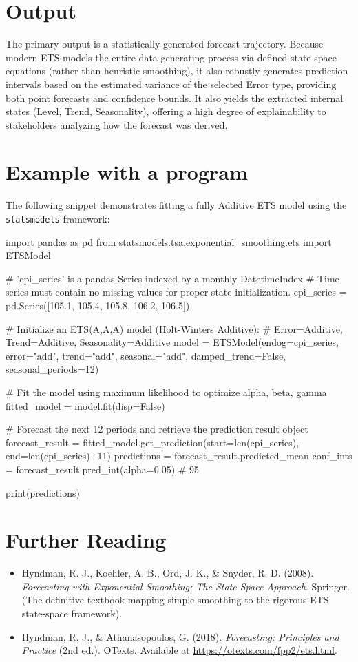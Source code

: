 \section{Output}
The primary output is a statistically generated forecast trajectory. Because modern ETS models the entire data-generating process via defined state-space equations (rather than heuristic smoothing), it also robustly generates prediction intervals based on the estimated variance of the selected Error type, providing both point forecasts and confidence bounds. It also yields the extracted internal states (Level, Trend, Seasonality), offering a high degree of explainability to stakeholders analyzing how the forecast was derived.

\section{Example with a program}
The following snippet demonstrates fitting a fully Additive ETS model using the \texttt{statsmodels} framework:

\begin{Python}[caption={ETS Implementation using Statsmodels}, label={lst:ets_python}]
import pandas as pd
from statsmodels.tsa.exponential_smoothing.ets import ETSModel

# 'cpi_series' is a pandas Series indexed by a monthly DatetimeIndex
# Time series must contain no missing values for proper state initialization.
cpi_series = pd.Series([105.1, 105.4, 105.8, 106.2, 106.5])

# Initialize an ETS(A,A,A) model (Holt-Winters Additive):
# Error=Additive, Trend=Additive, Seasonality=Additive
model = ETSModel(endog=cpi_series, 
                 error="add", 
                 trend="add", 
                 seasonal="add", 
                 damped_trend=False,
                 seasonal_periods=12)

# Fit the model using maximum likelihood to optimize alpha, beta, gamma
fitted_model = model.fit(disp=False)

# Forecast the next 12 periods and retrieve the prediction result object
forecast_result = fitted_model.get_prediction(start=len(cpi_series), end=len(cpi_series)+11)
predictions = forecast_result.predicted_mean
conf_ints = forecast_result.pred_int(alpha=0.05) # 95%

print(predictions)
\end{Python}

\section{Further Reading}
\begin{itemize}
    \item Hyndman, R. J., Koehler, A. B., Ord, J. K., \& Snyder, R. D. (2008). \textit{Forecasting with Exponential Smoothing: The State Space Approach}. Springer. (The definitive textbook mapping simple smoothing to the rigorous ETS state-space framework). \cite{Hyndman2018}
    \item Hyndman, R. J., \& Athanasopoulos, G. (2018). \textit{Forecasting: Principles and Practice} (2nd ed.). OTexts. Available at \url{https://otexts.com/fpp2/ets.html}.
\end{itemize}
